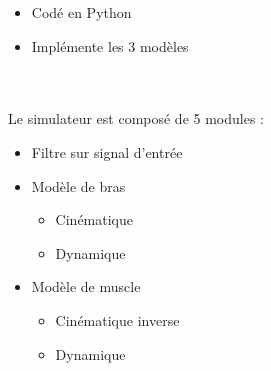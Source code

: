 \documentclass[pdftex,a4paper,11pt]{article}
\numberwithin{equation}{subsection}
\begin{document}
\begin{itemize}
    \item Codé en Python
    \item Implémente les 3 modèles
\end{itemize}

\begin{figure}
    \centering
    ~~~
    ~~~
\end{figure}

\paragraph{}
Le simulateur est composé de 5 modules :
\begin{itemize}
    \item Filtre sur signal d'entrée
    \item Modèle de bras
    \begin{itemize}
        \item Cinématique
        \item Dynamique
    \end{itemize}
    \item Modèle de muscle
    \begin{itemize}
        \item Cinématique inverse
        \item Dynamique
    \end{itemize}
\end{itemize}
\end{document}

